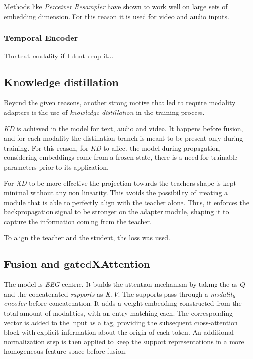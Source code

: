 Methods like \textit{Perceiver Resampler} have shown to work well on large sets of embedding dimension. For this reason it is used for video and audio inputs.


\subsubsection{Temporal Encoder}
The text modality if I dont drop it...

\subsection{Knowledge distillation}
Beyond the given reasons, another strong motive that led to require modality adapters is the use of \textit{knowledge distillation} in the training process.

\textit{KD} is achieved in the model for text, audio and video.
It happens before fusion, and for each modality the distillation branch is meant to be present only during training.
For this reason, for \textit{KD} to affect the model during propagation, considering embeddings come from a frozen state, there is a need for trainable parameters prior to its application.

For \textit{KD} to be more effective the projection towards the teachers shape is kept minimal without any non linearity. This avoids the possibility of creating a module that is able to perfectly align with the teacher alone.
Thus, it enforces the backpropagation signal to be stronger on the adapter module,
shaping it to capture the information coming from the teacher.

To align the teacher and the student, the  loss was used.


\subsection{Fusion and gatedXAttention}
The model is \textit{EEG} centric.
It builds the attention mechanism by taking the  as $Q$ and
the concatenated \textit{supports} as $K,V$.
The supports pass through a \textit{modality encoder} before concatenation.
It adds a weight embedding constructed from the total amount of modalities, with an entry matching each.
The corresponding vector is added to the input as a tag, providing the subsequent cross-attention block with explicit information about the origin of each token.
An additional normalization step is then applied to keep the support representations in a more homogeneous feature space before fusion.


